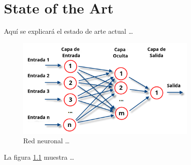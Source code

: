 
\chapter{State of the Art}
\label{cha:sota}

Aquí se explicará el estado de arte actual \ldots

\begin{figure}[!h]
\centering
\includegraphics[width=0.8\textwidth]{img/rnn.png}
\caption{\label{fig:rnn}Red neuronal \ldots}
\end{figure}
La figura \ref{fig:rnn} muestra \ldots